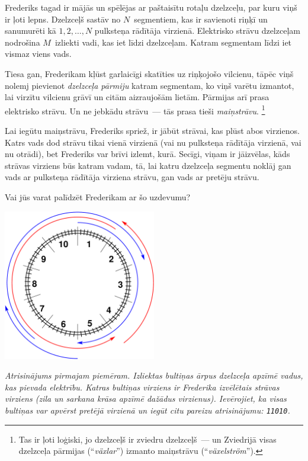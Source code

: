 \ifx\boi\undefined\fi
\def\version{jury-1}
Frederiks tagad ir mājās un spēlējas ar paštaisītu rotaļu dzelzceļu, par kuru viņš ir ļoti lepns.
Dzelzceļš sastāv no $N$~segmentiem, kas ir savienoti riņķī un sanumurēti kā $1, 2, \dots, N$ pulksteņa rādītāja virzienā.
Elektrisko strāvu dzelzceļam nodrošina $M$~izliekti vadi, kas iet līdzi dzelzceļam.
Katram segmentam līdzi iet vismaz viens vads.

Tiesa gan, Frederikam kļūst garlaicīgi skatīties uz riņķojošo vilcienu, tāpēc viņš nolemj pievienot \emph{dzelzceļa pārmiju}
katram segmentam, ko viņš varētu izmantot, lai virzītu vilcienu grāvī un citām aizraujošām lietām.
Pārmijas arī prasa elektrisko strāvu. Un ne jebkādu strāvu~--- tās prasa tieši \emph{maiņstrāvu}.%
\footnote{Tas ir ļoti loģiski, jo dzelzceļš ir zviedru dzelzceļš~--- un Zviedrijā visas dzelzceļa pārmijas
(``\emph{växlar}'') izmanto maiņstrāvu (``\emph{växelström}'').}

Lai iegūtu maiņstrāvu, Frederiks spriež, ir jābūt strāvai, kas plūst abos
virzienos. Katrs vads dod strāvu tikai vienā virzienā (vai nu pulksteņa rādītāja virzienā,
vai nu otrādi), bet Frederiks var brīvi izlemt, kurā. Secīgi, viņam ir jāizvēlas,
kāds strāvas virziens būs katram vadam, tā, lai katru dzelzceļa segmentu noklāj gan vads ar pulksteņa
rādītāja virziena strāvu, gan vads ar pretēju strāvu.

Vai jūs varat palīdzēt Frederikam ar šo uzdevumu?

\vspace{2mm}
\begin{center}
\includegraphics[width=0.5\textwidth]{alternatingfig.pdf}
\end{center}
\vspace{1mm}
{\em Atrisinājums pirmajam piemēram. Izliektas bultiņas ārpus dzelzceļa apzīmē vadus, kas pievada elektrību. Katras bultiņas virziens ir Frederika izvēlētais strāvas virziens (zila un sarkana krāsa apzīmē dažādus virzienus). Ievērojiet, ka visas bultiņas var apvērst pretējā virzienā un iegūt citu pareizu atrisinājumu: \texttt{11010}.}

